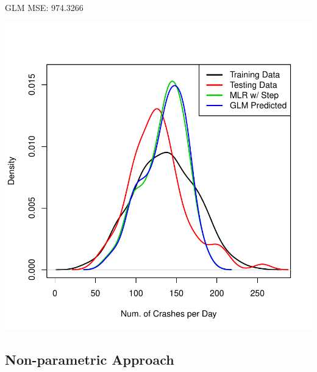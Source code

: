 \documentclass[11pt, a4paper]{article}
\begin{document}
\begin{Schunk}
\begin{Soutput}
GLM MSE: 974.3266
\end{Soutput}
\end{Schunk}
\includegraphics{regression-019}





\pagebreak
\subsection{Non-parametric Approach}
\end{document}
